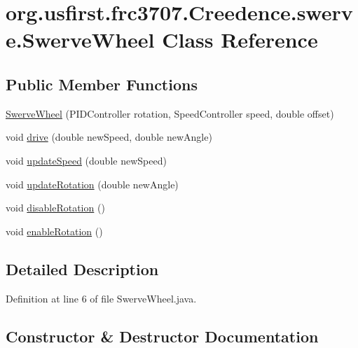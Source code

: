 \hypertarget{classorg_1_1usfirst_1_1frc3707_1_1_creedence_1_1swerve_1_1_swerve_wheel}{}\section{org.\+usfirst.\+frc3707.\+Creedence.\+swerve.\+Swerve\+Wheel Class Reference}
\label{classorg_1_1usfirst_1_1frc3707_1_1_creedence_1_1swerve_1_1_swerve_wheel}
\subsection*{Public Member Functions}
\begin{DoxyCompactItemize}
\item 
\mbox{\hyperlink{classorg_1_1usfirst_1_1frc3707_1_1_creedence_1_1swerve_1_1_swerve_wheel_ae77ea245b063a648c8c82ea581f3d76e}{Swerve\+Wheel}} (P\+I\+D\+Controller rotation, Speed\+Controller speed, double offset)
\item 
void \mbox{\hyperlink{classorg_1_1usfirst_1_1frc3707_1_1_creedence_1_1swerve_1_1_swerve_wheel_aa65ea2f7221e642cd1d62992dc9b1e7b}{drive}} (double new\+Speed, double new\+Angle)
\item 
void \mbox{\hyperlink{classorg_1_1usfirst_1_1frc3707_1_1_creedence_1_1swerve_1_1_swerve_wheel_ac7a7a649c8d0d48991bbab310c6f87b1}{update\+Speed}} (double new\+Speed)
\item 
void \mbox{\hyperlink{classorg_1_1usfirst_1_1frc3707_1_1_creedence_1_1swerve_1_1_swerve_wheel_a810610eacf59fe2e0ee791c7c05df9f8}{update\+Rotation}} (double new\+Angle)
\item 
void \mbox{\hyperlink{classorg_1_1usfirst_1_1frc3707_1_1_creedence_1_1swerve_1_1_swerve_wheel_a58eed438456c8962514459db7195489d}{disable\+Rotation}} ()
\item 
void \mbox{\hyperlink{classorg_1_1usfirst_1_1frc3707_1_1_creedence_1_1swerve_1_1_swerve_wheel_a68eeae5986d5e08830b04f104ad02e3a}{enable\+Rotation}} ()
\end{DoxyCompactItemize}


\subsection{Detailed Description}


Definition at line 6 of file Swerve\+Wheel.\+java.



\subsection{Constructor \& Destructor Documentation}
\mbox{\label{classorg_1_1usfirst_1_1frc3707_1_1_creedence_1_1swerve_1_1_swerve_wheel_ae77ea245b063a648c8c82ea581f3d76e}} 
